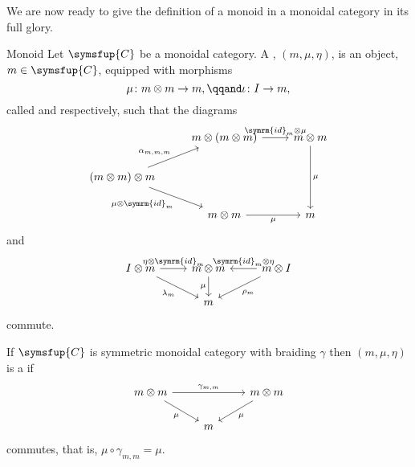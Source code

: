 \documentclass[fleqn]{NotesClass}
\newcommand{\cat}[1]{\symsfup{#1}}
\newcommand{\id}{\symrm{id}}
\begin{document}
    We are now ready to give the definition of a monoid in a monoidal category in its full glory.
    
    \begin{dfn}{Monoid}{}
        Let \(\cat{C}\) be a monoidal category.
        A , \((m, \mu, \eta)\), is an object, \(m \in \cat{C}\), equipped with morphisms
        \begin{equation}
            \mu \colon m \otimes m \to m, \qqand \iota \colon I \to m,
        \end{equation}
        called  and  respectively, such that the diagrams
        \begin{equation}
            \begin{tikzcd}
                & m \otimes (m \otimes m) \arrow[r, "\id_m \otimes \mu"] & m \otimes m \arrow[dd, "\mu"]\\
                (m \otimes m) \otimes m \arrow[ur, "{\alpha_{m,m,m}}"] \arrow[dr, "\mu \otimes \id_m"']\\
                & m \otimes m \arrow[r, "\mu"'] & m
            \end{tikzcd}
        \end{equation}
        and
        \begin{equation}
            \begin{tikzcd}
                I \otimes m \arrow[r, "\eta \otimes \id_m"] \arrow[dr, "\lambda_m"'] & m \otimes m \arrow[d, "\mu"'] & m \otimes I \arrow[l, "\id_m \otimes \eta"'] \arrow[dl, "\rho_m"]\\
                & m
            \end{tikzcd}
        \end{equation}
        commute.
        
        If \(\cat{C}\) is symmetric monoidal category with braiding \(\gamma\) then \((m, \mu, \eta)\) is a  if
        \begin{equation}
            \begin{tikzcd}
                m \otimes m \arrow[rr, "\gamma_{m,m}"] \arrow[dr, "\mu"'] && m \otimes m \arrow[dl, "\mu"]\\
                & m
            \end{tikzcd}
        \end{equation}
        commutes, that is, \(\mu \circ \gamma_{m,m} = \mu\).
    \end{dfn}
    
\end{document}
